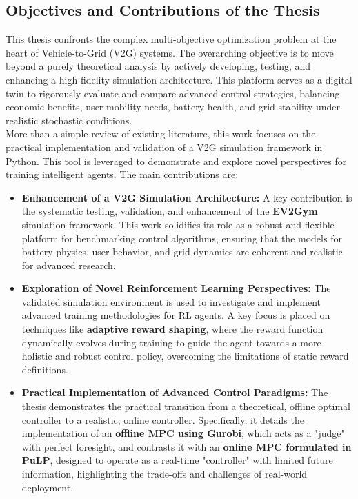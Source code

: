\subsection{Objectives and Contributions of the Thesis}

This thesis confronts the complex multi-objective optimization problem at the heart of Vehicle-to-Grid (V2G) systems. The overarching objective is to move beyond a purely theoretical analysis by actively developing, testing, and enhancing a high-fidelity simulation architecture. This platform serves as a digital twin to rigorously evaluate and compare advanced control strategies, balancing economic benefits, user mobility needs, battery health, and grid stability under realistic stochastic conditions.
\\
More than a simple review of existing literature, this work focuses on the practical implementation and validation of a V2G simulation framework in Python. This tool is leveraged to demonstrate and explore novel perspectives for training intelligent agents. The main contributions are:

\begin{itemize}
    \item \textbf{Enhancement of a V2G Simulation Architecture:} A key contribution is the systematic testing, validation, and enhancement of the \textbf{EV2Gym} simulation framework. This work solidifies its role as a robust and flexible platform for benchmarking control algorithms, ensuring that the models for battery physics, user behavior, and grid dynamics are coherent and realistic for advanced research.

    \item \textbf{Exploration of Novel Reinforcement Learning Perspectives:} The validated simulation environment is used to investigate and implement advanced training methodologies for RL agents. A key focus is placed on techniques like \textbf{adaptive reward shaping}, where the reward function dynamically evolves during training to guide the agent towards a more holistic and robust control policy, overcoming the limitations of static reward definitions.

    \item \textbf{Practical Implementation of Advanced Control Paradigms:} The thesis demonstrates the practical transition from a theoretical, offline optimal controller to a realistic, online controller. Specifically, it details the implementation of an \textbf{offline MPC using Gurobi}, which acts as a "judge" with perfect foresight, and contrasts it with an \textbf{online MPC formulated in PuLP}, designed to operate as a real-time "controller" with limited future information, highlighting the trade-offs and challenges of real-world deployment.
\end{itemize}

